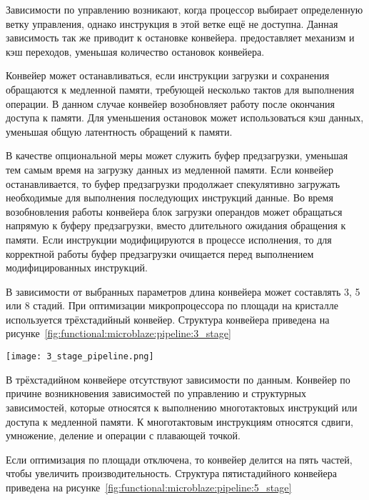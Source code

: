 Зависимости по управлению возникают, когда процессор выбирает определенную ветку управления, однако инструкция
в этой ветке ещё не доступна. Данная зависимость так же приводит к остановке конвейера.  предоставляет
механизм  и кэш переходов, уменьшая количество остановок конвейера.

Конвейер может останавливаться, если инструкции загрузки и сохранения обращаются к медленной памяти, требующей
несколько тактов для выполнения операции. В данном случае конвейер возобновляет работу после окончания доступа к
памяти. Для уменьшения остановок может использоваться кэш данных, уменьшая общую латентность обращений к памяти.

В качестве опциональной меры может служить буфер предзагрузки, уменьшая тем самым время на загрузку данных из
медленной памяти. Если конвейер останавливается, то буфер предзагрузки продолжает спекулятивно загружать необходимые
для выполнения последующих инструкций данные. Во время возобновления работы конвейера блок загрузки операндов может
обращаться напрямую к буферу предзагрузки, вместо длительного ожидания обращения к памяти. Если инструкции модифицируются
в процессе исполнения, то для корректной работы буфер предзагрузки очищается перед выполнением модифицированных инструкций.

В зависимости от выбранных параметров длина конвейера может составлять 3, 5 или 8 стадий.
При оптимизации микропроцессора по площади на кристалле используется трёхстадийный конвейер. Структура конвейера
приведена на рисунке~\ref{fig:functional:microblaze:pipeline:3_stage}

\begin{center}
  \centering
  \texttt{[image: 3\_stage\_pipeline.png]}
  \label{fig:functional:microblaze:pipeline:3_stage}
\end{center}

В трёхстадийном конвейере отсутствуют зависимости по данным. Конвейер по причине возникновения
зависимостей по управлению и структурных зависимостей, которые относятся к выполнению многотактовых
инструкций или доступа к медленной памяти. К многотактовым инструкциям относятся сдвиги, умножение,
деление и операции с плавающей точкой.

Если оптимизация по площади отключена, то конвейер делится на пять частей, чтобы увеличить
производительность.
Структура пятистадийного конвейера приведена на рисунке~\ref{fig:functional:microblaze:pipeline:5_stage}

